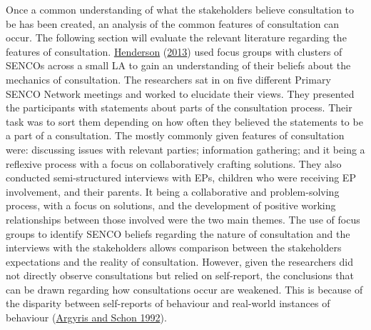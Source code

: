 \documentclass[
]{article}
\begin{document}
Once a common understanding of what the stakeholders believe
consultation to be has been created, an analysis of the common features
of consultation can occur. The following section will evaluate the
relevant literature regarding the features of consultation.
\protect\hyperlink{ref-hendersonExplorationImpactConsultation2013}{Henderson}
(\protect\hyperlink{ref-hendersonExplorationImpactConsultation2013}{2013})
used focus groups with clusters of SENCOs across a small LA to gain an
understanding of their beliefs about the mechanics of consultation. The
researchers sat in on five different Primary SENCO Network meetings and
worked to elucidate their views. They presented the participants with
statements about parts of the consultation process. Their task was to
sort them depending on how often they believed the statements to be a
part of a consultation. The mostly commonly given features of
consultation were: discussing issues with relevant parties; information
gathering; and it being a reflexive process with a focus on
collaboratively crafting solutions. They also conducted semi-structured
interviews with EPs, children who were receiving EP involvement, and
their parents. It being a collaborative and problem-solving process,
with a focus on solutions, and the development of positive working
relationships between those involved were the two main themes. The use
of focus groups to identify SENCO beliefs regarding the nature of
consultation and the interviews with the stakeholders allows comparison
between the stakeholders expectations and the reality of consultation.
However, given the researchers did not directly observe consultations
but relied on self-report, the conclusions that can be drawn regarding
how consultations occur are weakened. This is because of the disparity
between self-reports of behaviour and real-world instances of behaviour
(\protect\hyperlink{ref-argyrisTheoryPracticeIncreasing1992}{Argyris and
Schon 1992}).
\end{document}
